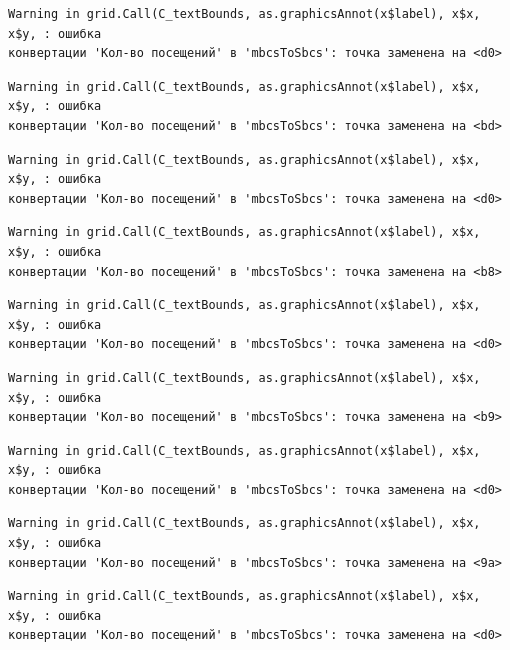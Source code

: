 \documentclass[
  letterpaper,
  DIV=11,
  numbers=noendperiod]{scrreprt}
\begin{document}
\begin{verbatim}
Warning in grid.Call(C_textBounds, as.graphicsAnnot(x$label), x$x, x$y, : ошибка
конвертации 'Кол-во посещений' в 'mbcsToSbcs': точка заменена на <d0>
\end{verbatim}

\begin{verbatim}
Warning in grid.Call(C_textBounds, as.graphicsAnnot(x$label), x$x, x$y, : ошибка
конвертации 'Кол-во посещений' в 'mbcsToSbcs': точка заменена на <bd>
\end{verbatim}

\begin{verbatim}
Warning in grid.Call(C_textBounds, as.graphicsAnnot(x$label), x$x, x$y, : ошибка
конвертации 'Кол-во посещений' в 'mbcsToSbcs': точка заменена на <d0>
\end{verbatim}

\begin{verbatim}
Warning in grid.Call(C_textBounds, as.graphicsAnnot(x$label), x$x, x$y, : ошибка
конвертации 'Кол-во посещений' в 'mbcsToSbcs': точка заменена на <b8>
\end{verbatim}

\begin{verbatim}
Warning in grid.Call(C_textBounds, as.graphicsAnnot(x$label), x$x, x$y, : ошибка
конвертации 'Кол-во посещений' в 'mbcsToSbcs': точка заменена на <d0>
\end{verbatim}

\begin{verbatim}
Warning in grid.Call(C_textBounds, as.graphicsAnnot(x$label), x$x, x$y, : ошибка
конвертации 'Кол-во посещений' в 'mbcsToSbcs': точка заменена на <b9>
\end{verbatim}

\begin{verbatim}
Warning in grid.Call(C_textBounds, as.graphicsAnnot(x$label), x$x, x$y, : ошибка
конвертации 'Кол-во посещений' в 'mbcsToSbcs': точка заменена на <d0>
\end{verbatim}

\begin{verbatim}
Warning in grid.Call(C_textBounds, as.graphicsAnnot(x$label), x$x, x$y, : ошибка
конвертации 'Кол-во посещений' в 'mbcsToSbcs': точка заменена на <9a>
\end{verbatim}

\begin{verbatim}
Warning in grid.Call(C_textBounds, as.graphicsAnnot(x$label), x$x, x$y, : ошибка
конвертации 'Кол-во посещений' в 'mbcsToSbcs': точка заменена на <d0>
\end{verbatim}
\end{document}
